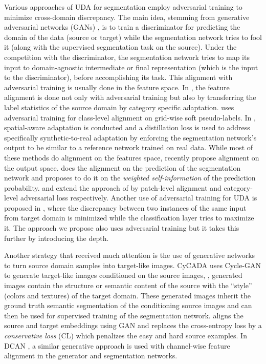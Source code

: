 \documentclass[10pt,twocolumn,letterpaper]{article}
\begin{document}
Various approaches of UDA for segmentation employ adversarial training to minimize cross-domain discrepancy. The main idea, stemming from generative adversarial networks (GANs) \cite{goodfellow2014generative}, is to train a discriminator for predicting the domain of the data (source or target) while the segmentation network tries to fool it (along with the supervised segmentation task on the source). Under the competition with the discriminator, the segmentation network tries to map its input to domain-agnostic  intermediate or final representation (which is the input to the discriminator), before accomplishing its task. This alignment with adversarial training is usually done in the feature space.
In \cite{hoffman2016fcns}, the feature alignment is done not only with adversarial training but also by transferring the label statistics of the source domain by category specific adaptation. \cite{chen2017no} uses adversarial training for class-level alignment on grid-wise soft pseudo-labels. In \cite{chen2018CVPR}, spatial-aware adaptation is conducted and a distillation loss is used to address specifically synthetic-to-real adaptation by enforcing the segmentation network's output to be similar to a reference network trained on real data. While most of these methods do alignment on the features space, recently \cite{tsai2018learning, vu2018advent} propose alignment on the output space. \cite{tsai2018learning} does the alignment on the prediction of the segmentation network and \cite{vu2018advent} proposes to do it on the \textit{weighted self-information} of the prediction probability.
\cite{tsai2019domain} and \cite{luo2018taking} extend the approach of \cite{tsai2018learning} by patch-level alignment and category-level adversarial loss respectively.
Another use of adversarial training for UDA is proposed in \cite{saito2017adversarial, saito2017maximum}, where the discrepancy between two instances of the same input from target domain is minimized while the classification layer tries to maximize it. The approach we propose also uses adversarial training but it takes this further by introducing the depth.

Another strategy that received much attention is the use of generative networks to turn source domain samples into target-like images. CyCADA \cite{hoffman18a} uses Cycle-GAN \cite{zhu2017unpaired} to generate target-like images conditioned on the source images, \ie, generated images contain the structure or semantic content of the source with the ``style'' (colors and textures) of the target domain. These generated images inherit the ground truth semantic segmentation of the conditioning source images and can then be used for supervised training of the segmentation network. 
\cite{zhu2018ECCV} aligns the source and target embeddings using GAN \cite{goodfellow2014generative} and replaces the cross-entropy loss by a \textit{conservative loss} (CL) which penalizes the easy and hard source examples. In DCAN \cite{wu2018dcan}, a similar generative approach is used with channel-wise feature alignment in the generator and segmentation networks. 
\end{document}
